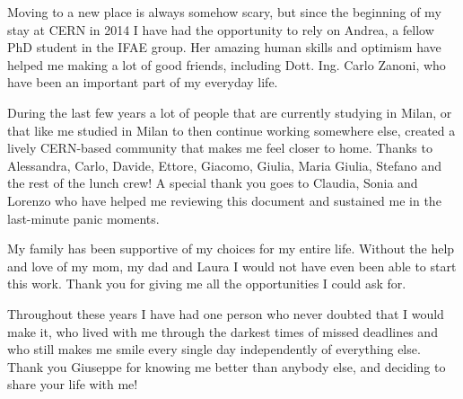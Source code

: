 \par\medskip 
Moving to a new place is always somehow scary, but since the beginning of my 
stay at CERN in 2014 I have had the opportunity to rely on Andrea, a fellow PhD student in the 
IFAE group. 
Her amazing human skills and optimism have helped me making a lot of good friends, including Dott. Ing. 
Carlo Zanoni, who have been an important part of my everyday life. 

\par\medskip

During the last few years a lot of people that are currently studying in Milan, or that like me 
studied in Milan to then continue working somewhere else, created a lively CERN-based community that 
makes me feel closer to home. 
Thanks to Alessandra, Carlo, Davide, Ettore, Giacomo, Giulia, Maria Giulia, Stefano and the rest of the 
lunch crew! A special thank you goes to Claudia, Sonia and Lorenzo who have helped me reviewing this document and 
sustained me in the last-minute panic moments. 

\par\medskip 
My family has been supportive of my choices for my entire life. 
Without the help and love of my mom, my dad and Laura I would not have even been able to start this work. 
Thank you for giving me all the opportunities I could ask for. 

\par\medskip 
Throughout these years I have had one person who never doubted that I would make it, 
who lived with me through the darkest times of missed deadlines 
and who still makes me smile every single day independently 
of everything else. 
Thank you Giuseppe for knowing me better than anybody else, 
and deciding to share your life with me! 


